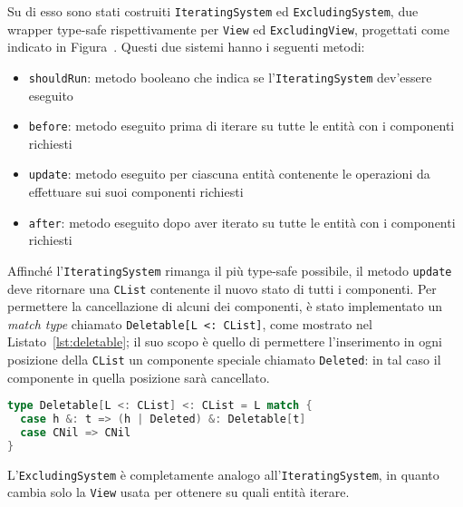 Su di esso sono stati costruiti \texttt{IteratingSystem} ed \texttt{ExcludingSystem}, due wrapper type-safe
rispettivamente per \texttt{View} ed \texttt{ExcludingView}, progettati come indicato in Figura~.
Questi due sistemi hanno i seguenti metodi:
\begin{itemize}
    \item \texttt{shouldRun}: metodo booleano che indica se l'\texttt{IteratingSystem} dev'essere eseguito
    \item \texttt{before}: metodo eseguito prima di iterare su tutte le entità con i componenti richiesti
    \item \texttt{update}: metodo eseguito per ciascuna entità contenente le operazioni da effettuare sui suoi
    componenti richiesti
    \item \texttt{after}: metodo eseguito dopo aver iterato su tutte le entità con i componenti richiesti
\end{itemize}

Affinché l'\texttt{IteratingSystem} rimanga il più type-safe possibile, il metodo \texttt{update} deve ritornare una
\texttt{CList} contenente il nuovo stato di tutti i componenti.
Per permettere la cancellazione di alcuni dei componenti, è stato implementato un \textit{match type} chiamato
\texttt{Deletable[L~<:~CList]}, come mostrato nel Listato~\ref{lst:deletable};
il suo scopo è quello di permettere l'inserimento in ogni posizione della \texttt{CList} un componente speciale chiamato
\texttt{Deleted}: in tal caso il componente in quella posizione sarà cancellato.

\begin{lstlisting}[language=Scala,label={lst:deletable},caption=Implementazione del tipo \texttt{Deletable[L~<:~CList]}]
type Deletable[L <: CList] <: CList = L match {
  case h &: t => (h | Deleted) &: Deletable[t]
  case CNil => CNil
}
\end{lstlisting}

L'\texttt{ExcludingSystem} è completamente analogo all'\texttt{IteratingSystem}, in quanto cambia solo la \texttt{View}
usata per ottenere su quali entità iterare.